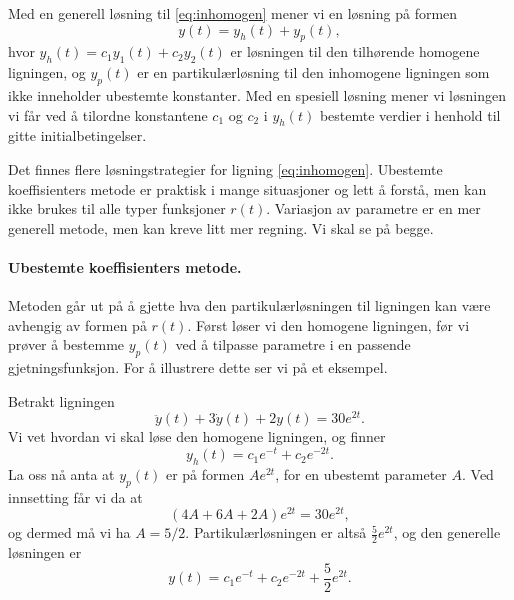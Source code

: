 \documentclass{article}
\theoremstyle{definition}
\theoremstyle{remark}
\newenvironment{defn}
{\pushQED{\qed}\renewcommand{\qedsymbol}{$\triangle$}\defnx}
{\popQED\enddefnx}
\newenvironment{ex}
{\pushQED{\qed}\renewcommand{\qedsymbol}{$\triangle$}\exx}
{\popQED\endexx}
\begin{document}
\begin{multicols*}{2}
\begin{defn}
    Med en generell løsning til \eqref{eq:inhomogen} mener vi en løsning på formen
    \begin{equation*}
        y(t) = y_h(t) + y_p(t),    
    \end{equation*}
    hvor $y_h(t) = c_1 y_1(t) + c_2 y_2(t)$ er løsningen til den tilhørende homogene ligningen, og $y_p(t)$ er en partikulærløsning til den inhomogene ligningen som ikke inneholder ubestemte konstanter. Med en spesiell løsning mener vi løsningen vi får ved å tilordne konstantene $c_1$ og $c_2$ i $y_h(t)$ bestemte verdier i henhold til gitte initialbetingelser.
\end{defn}

Det finnes flere løsningstrategier for ligning \eqref{eq:inhomogen}. Ubestemte koeffisienters metode er praktisk i mange situasjoner og lett å forstå, men kan ikke brukes til alle typer funksjoner $r(t)$. Variasjon av parametre er en mer generell metode, men kan kreve litt mer regning. Vi skal se på begge.

\paragraph*{Ubestemte koeffisienters metode.} Metoden går ut på å gjette hva den partikulærløsningen til ligningen kan være avhengig av formen på $r(t)$. Først løser vi den homogene ligningen, før vi prøver å bestemme $y_p(t)$ ved å tilpasse parametre i en passende gjetningsfunksjon. For å illustrere dette ser vi på et eksempel.

\begin{ex}
  Betrakt ligningen
  \begin{equation*}
    \ddot{y}(t) + 3 \dot{y}(t) + 2 y(t) = 30 e^{2 t}.
  \end{equation*}
  Vi vet hvordan vi skal løse den homogene ligningen, og finner
  \begin{equation*}
    y_h(t) = c_1 e^{-t} + c_2 e^{-2 t}.
  \end{equation*}
  La oss nå anta at $y_p(t)$ er på formen $A e^{2t}$, for en ubestemt parameter $A$. Ved innsetting får vi da at
  \begin{equation*}
    (4 A + 6 A + 2 A) e^{2 t} = 30 e^{2 t},
  \end{equation*}
  og dermed må vi ha $A = 5/2$. Partikulærløsningen er altså $\frac{5}{2} e^{2 t}$, og den generelle løsningen er
  \begin{equation*}
    y(t) = c_1 e^{-t} + c_2 e^{-2 t} + \frac{5}{2} e^{2 t}.
  \end{equation*}
\end{ex}


\end{multicols*}
\end{document}
